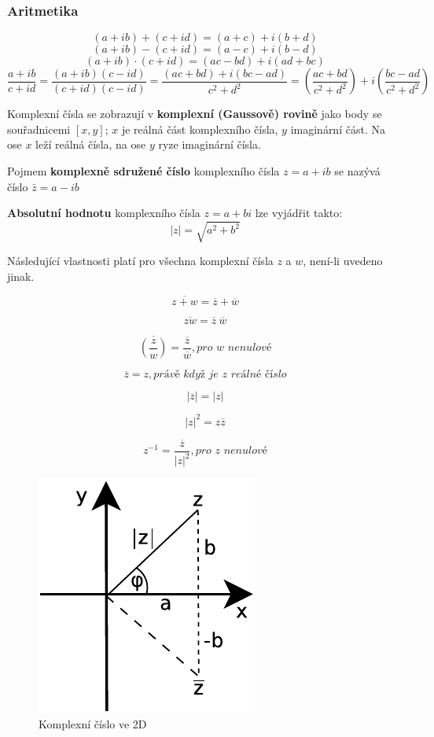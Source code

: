 \subsubsection{Aritmetika}
$$(a + ib) + (c+ id) = (a+c) + i(b+d)$$
$$(a + ib) - (c+ id) = (a-c) + i(b-d)$$
$$(a + ib) \cdot (c+ id) = (ac-bd) + i(ad+bc)$$
$$\frac{a+ib}{c+id}  = \frac{(a+ib)(c-id)}{(c+id)(c-id)} = \frac{(ac+bd) + i(bc-ad)}{c^2+d^2} = \left( \frac{ac+bd}{c^2+d^2} \right) + i \left( \frac{bc-ad}{c^2+d^2} \right)$$

Komplexní čísla se zobrazují v \textbf{komplexní (Gaussově) rovině} jako body se souřadnicemi $[x,y]$; $x$ je reálná část komplexního čísla, $y$ imaginární část. Na ose $x$ leží reálná čísla, na ose $y$ ryze imaginární čísla.

Pojmem \textbf{komplexně sdružené číslo} komplexního čísla $z = a + ib$ se nazývá číslo $\bar{z} = a - ib$

\textbf{Absolutní hodnotu} komplexního čísla $z = a + bi$ lze vyjádřit takto:
$$|z| = \sqrt{a^2 + b^2}$$


Následující vlastnosti platí pro všechna komplexní čísla $z$ a $w$, není-li uvedeno jinak.

$$\overline{z + w} = \overline{z} + \overline{w}$$

$$\overline{zw} = \overline{z}\ \overline{w}$$

$$\overline{\left({\frac{z}{w}}\right)} = \frac{\overline{z}}{\overline{w}}, \textit{pro w nenulové}$$

$$\overline{z} = z, \textit{právě když je z reálné číslo}$$

$$\left| \overline{z} \right| = \left| z \right|$$

$${\left| z \right|}^2 = z\overline{z}$$

$$z^{-1} = \frac{\overline{z}}{{\left| z \right|}^2}, \textit{pro z nenulové}$$

\begin{figure}
\centering%
\includegraphics{matematika/obrazky/01-dia1}
\caption{Komplexní číslo ve 2D}
\label{fig:ComplexNum2D}
\end{figure}


